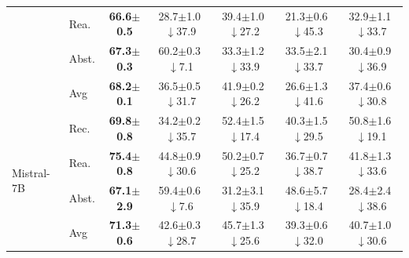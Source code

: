 \begin{table}[t]
\begin{tabular}{@{}ll c c c c c @{}}
 & Rea. & \textbf{66.6{\scriptsize$\pm$0.5}} & 28.7{\scriptsize$\pm$1.0}\,{\tiny\textcolor{red!70!black}{$\downarrow$37.9}} & 39.4{\scriptsize$\pm$1.0}\,{\tiny\textcolor{red!70!black}{$\downarrow$27.2}} & 21.3{\scriptsize$\pm$0.6}\,{\tiny\textcolor{red!70!black}{$\downarrow$45.3}} & 32.9{\scriptsize$\pm$1.1}\,{\tiny\textcolor{red!70!black}{$\downarrow$33.7}} \\
 & Abst. & \textbf{67.3{\scriptsize$\pm$0.3}} & 60.2{\scriptsize$\pm$0.3}\,{\tiny\textcolor{red!70!black}{$\downarrow$7.1}} & 33.3{\scriptsize$\pm$1.2}\,{\tiny\textcolor{red!70!black}{$\downarrow$33.9}} & 33.5{\scriptsize$\pm$2.1}\,{\tiny\textcolor{red!70!black}{$\downarrow$33.7}} & 30.4{\scriptsize$\pm$0.9}\,{\tiny\textcolor{red!70!black}{$\downarrow$36.9}} \\
 & Avg & \textbf{68.2{\scriptsize$\pm$0.1}} & 36.5{\scriptsize$\pm$0.5}\,{\tiny\textcolor{red!70!black}{$\downarrow$31.7}} & 41.9{\scriptsize$\pm$0.2}\,{\tiny\textcolor{red!70!black}{$\downarrow$26.2}} & 26.6{\scriptsize$\pm$1.3}\,{\tiny\textcolor{red!70!black}{$\downarrow$41.6}} & 37.4{\scriptsize$\pm$0.6}\,{\tiny\textcolor{red!70!black}{$\downarrow$30.8}} \\
\midrule
\multirow{4}{*}{Mistral-7B} & Rec. & \textbf{69.8{\scriptsize$\pm$0.8}} & 34.2{\scriptsize$\pm$0.2}\,{\tiny\textcolor{red!70!black}{$\downarrow$35.7}} & 52.4{\scriptsize$\pm$1.5}\,{\tiny\textcolor{red!70!black}{$\downarrow$17.4}} & 40.3{\scriptsize$\pm$1.5}\,{\tiny\textcolor{red!70!black}{$\downarrow$29.5}} & 50.8{\scriptsize$\pm$1.6}\,{\tiny\textcolor{red!70!black}{$\downarrow$19.1}} \\
 & Rea. & \textbf{75.4{\scriptsize$\pm$0.8}} & 44.8{\scriptsize$\pm$0.9}\,{\tiny\textcolor{red!70!black}{$\downarrow$30.6}} & 50.2{\scriptsize$\pm$0.7}\,{\tiny\textcolor{red!70!black}{$\downarrow$25.2}} & 36.7{\scriptsize$\pm$0.7}\,{\tiny\textcolor{red!70!black}{$\downarrow$38.7}} & 41.8{\scriptsize$\pm$1.3}\,{\tiny\textcolor{red!70!black}{$\downarrow$33.6}} \\
 & Abst. & \textbf{67.1{\scriptsize$\pm$2.9}} & 59.4{\scriptsize$\pm$0.6}\,{\tiny\textcolor{red!70!black}{$\downarrow$7.6}} & 31.2{\scriptsize$\pm$3.1}\,{\tiny\textcolor{red!70!black}{$\downarrow$35.9}} & 48.6{\scriptsize$\pm$5.7}\,{\tiny\textcolor{red!70!black}{$\downarrow$18.4}} & 28.4{\scriptsize$\pm$2.4}\,{\tiny\textcolor{red!70!black}{$\downarrow$38.6}} \\
 & Avg & \textbf{71.3{\scriptsize$\pm$0.6}} & 42.6{\scriptsize$\pm$0.3}\,{\tiny\textcolor{red!70!black}{$\downarrow$28.7}} & 45.7{\scriptsize$\pm$1.3}\,{\tiny\textcolor{red!70!black}{$\downarrow$25.6}} & 39.3{\scriptsize$\pm$0.6}\,{\tiny\textcolor{red!70!black}{$\downarrow$32.0}} & 40.7{\scriptsize$\pm$1.0}\,{\tiny\textcolor{red!70!black}{$\downarrow$30.6}} \\

\end{tabular}
\end{table}
